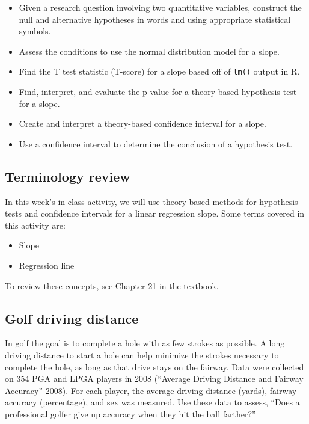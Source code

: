 \documentclass[
]{report}
\begin{document}
\begin{itemize}
\item
  Given a research question involving two quantitative variables, construct the null and alternative hypotheses
  in words and using appropriate statistical symbols.
\item
  Assess the conditions to use the normal distribution model for a slope.
\item
  Find the T test statistic (T-score) for a slope based off of \texttt{lm()} output in R.
\item
  Find, interpret, and evaluate the p-value for a theory-based hypothesis test for a slope.
\item
  Create and interpret a theory-based confidence interval for a slope.
\item
  Use a confidence interval to determine the conclusion of a hypothesis test.
\end{itemize}

\hypertarget{terminology-review-24}{%
\subsection{Terminology review}\label{terminology-review-24}}

In this week's in-class activity, we will use theory-based methods for hypothesis tests and confidence intervals for a linear regression slope. Some terms covered in this activity are:

\begin{itemize}
\item
  Slope
\item
  Regression line
\end{itemize}

To review these concepts, see Chapter 21 in the textbook.

\hypertarget{golf-driving-distance}{%
\subsection{Golf driving distance}\label{golf-driving-distance}}

In golf the goal is to complete a hole with as few strokes as possible. A long driving distance to start a hole can help minimize the strokes necessary to complete the hole, as long as that drive stays on the fairway. Data were collected on 354 PGA and LPGA players in 2008 ({``Average Driving Distance and Fairway Accuracy''} 2008). For each player, the average driving distance (yards), fairway accuracy (percentage), and sex was measured. Use these data to assess, ``Does a professional golfer give up accuracy when they hit the ball farther?''
\end{document}
